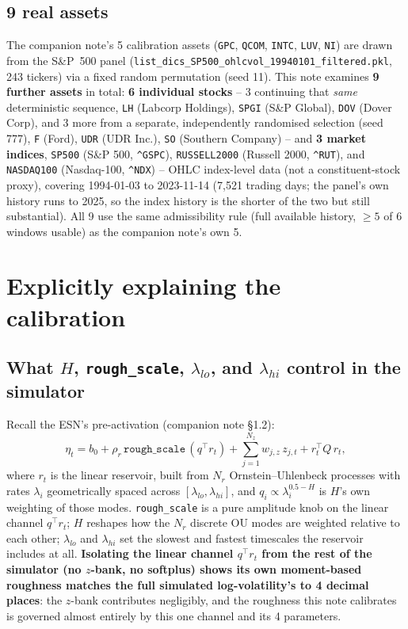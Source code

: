 \documentclass[11pt]{article}
\begin{document}
\subsection{9 real assets}
The companion note's 5 calibration assets (\texttt{GPC}, \texttt{QCOM}, \texttt{INTC},
\texttt{LUV}, \texttt{NI}) are drawn from the S\&P~500 panel
(\texttt{list\_dics\_SP500\_ohlcvol\_19940101\_filtered.pkl}, 243 tickers) via a fixed
random permutation (seed 11). This note examines \textbf{9 further assets} in total:
\textbf{6 individual stocks} -- 3 continuing that \emph{same} deterministic sequence,
\texttt{LH} (Labcorp Holdings), \texttt{SPGI} (S\&P Global), \texttt{DOV} (Dover
Corp), and 3 more from a separate, independently randomised selection (seed 777),
\texttt{F} (Ford), \texttt{UDR} (UDR Inc.), \texttt{SO} (Southern Company) -- and
\textbf{3 market indices}, \texttt{SP500} (S\&P 500, \texttt{\^{}GSPC}),
\texttt{RUSSELL2000} (Russell 2000, \texttt{\^{}RUT}), and \texttt{NASDAQ100}
(Nasdaq-100, \texttt{\^{}NDX}) -- OHLC index-level data (not a constituent-stock
proxy), covering 1994-01-03 to 2023-11-14 (7,521 trading days; the panel's own
history runs to 2025, so the index history is the shorter of the two but still
substantial). All 9 use the same admissibility rule (full available history,
$\ge5$ of 6 windows usable) as the companion note's own 5.

\section{Explicitly explaining the calibration}
\label{sec:calibexplain}

\subsection{What $H$, \texttt{rough\_scale}, $\lambda_{lo}$, and $\lambda_{hi}$ control in the simulator}
Recall the ESN's pre-activation (companion note \S1.2):
\[
\eta_t = b_0 + \rho_r\,\texttt{rough\_scale}\,(q^\top r_t)
       + \sum_{j=1}^{N_z} w_{j,z}\,z_{j,t} + r_t^\top Q\, r_t,
\]
where $r_t$ is the linear reservoir, built from $N_r$ Ornstein--Uhlenbeck processes
with rates $\lambda_i$ geometrically spaced across $[\lambda_{lo},\lambda_{hi}]$, and
$q_i\propto\lambda_i^{0.5-H}$ is $H$'s own weighting of those modes.
\texttt{rough\_scale} is a pure amplitude knob on the linear channel $q^\top r_t$;
$H$ reshapes how the $N_r$ discrete OU modes are weighted relative to each other;
$\lambda_{lo}$ and $\lambda_{hi}$ set the slowest and fastest timescales the
reservoir includes at all. \textbf{Isolating the linear channel $q^\top r_t$ from
the rest of the simulator (no $z$-bank, no softplus) shows its own moment-based
roughness matches the full simulated log-volatility's to 4 decimal places}: the
$z$-bank contributes negligibly, and the roughness this note calibrates is governed
almost entirely by this one channel and its 4 parameters.
\end{document}
